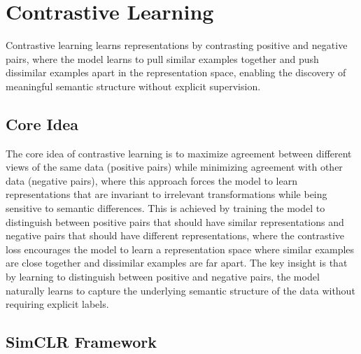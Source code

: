 
\section{Contrastive Learning }
\label{sec:contrastive-learning}

Contrastive learning learns representations by contrasting positive and negative pairs, where the model learns to pull similar examples together and push dissimilar examples apart in the representation space, enabling the discovery of meaningful semantic structure without explicit supervision.

\subsection{Core Idea}

The core idea of contrastive learning is to maximize agreement between different views of the same data (positive pairs) while minimizing agreement with other data (negative pairs), where this approach forces the model to learn representations that are invariant to irrelevant transformations while being sensitive to semantic differences. This is achieved by training the model to distinguish between positive pairs that should have similar representations and negative pairs that should have different representations, where the contrastive loss encourages the model to learn a representation space where similar examples are close together and dissimilar examples are far apart. The key insight is that by learning to distinguish between positive and negative pairs, the model naturally learns to capture the underlying semantic structure of the data without requiring explicit labels.

\subsection{SimCLR Framework}

